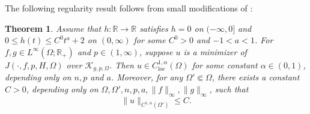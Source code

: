 \documentclass[11pt,oneside,english]{amsart}
\newcommand{\R}{{\mathbb R}}
\newcommand{\cK}{{\mathcal K}}
\newcommand{\al}{\alpha}
\newcommand{\loc}{\operatorname{loc}}
\numberwithin{equation}{section}
\newtheorem{theorem}{Theorem}
\theoremstyle{plain}
\numberwithin{equation}{section}
\begin{document}
The following regularity result follows from small modifications of \cite[Theorems~5 and ~6]{JeoSha24}:

\begin{theorem}
    \label{thm:p-Lapl-reg}
Assume that $h:\R\to\R$ satisfies $h=0$ on $(-\infty,0]$ and $0\le h(t)\le C^0t^a+2$ on $(0,\infty)$ for some $C^0>0$ and $-1<a<1$. For $f,g\in L^\infty(\Omega;\R_+)$ and $p\in(1,\infty)$, suppose $u$ is a minimizer of $J(\cdot,f,p,H,\Omega)$ over $\cK_{g,p,\Omega}$. Then $u\in C^{1,\al}_{\loc}(\Omega)$ for some constant $\al\in(0,1)$, depending only on $n,p$ and $a$. Moreover, for any $\Omega'\Subset\Omega$, there exists a constant $C>0$, depending only on $\Omega,\Omega',n,p,a,\|f\|_\infty,\|g\|_\infty$, such that
$$
\|u\|_{C^{1,\al}(\Omega')}\le C.
$$
\end{theorem}
\end{document}
